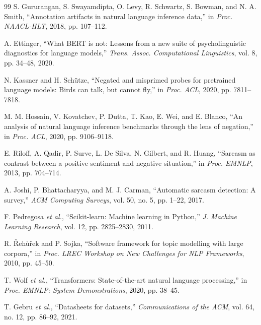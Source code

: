 \documentclass[conference]{IEEEtran}
\begin{document}
\begin{thebibliography}{99}
 S. Gururangan, S. Swayamdipta, O. Levy, R. Schwartz, S. Bowman, and N. A. Smith, ``Annotation artifacts in natural language inference data,'' in \emph{Proc. NAACL-HLT}, 2018, pp. 107--112.

 A. Ettinger, ``What BERT is not: Lessons from a new suite of psycholinguistic diagnostics for language models,'' \emph{Trans. Assoc. Computational Linguistics}, vol. 8, pp. 34--48, 2020.

 N. Kassner and H. Sch\"utze, ``Negated and misprimed probes for pretrained language models: Birds can talk, but cannot fly,'' in \emph{Proc. ACL}, 2020, pp. 7811--7818.

 M. M. Hossain, V. Kovatchev, P. Dutta, T. Kao, E. Wei, and E. Blanco, ``An analysis of natural language inference benchmarks through the lens of negation,'' in \emph{Proc. ACL}, 2020, pp. 9106--9118.

 E. Riloff, A. Qadir, P. Surve, L. De Silva, N. Gilbert, and R. Huang, ``Sarcasm as contrast between a positive sentiment and negative situation,'' in \emph{Proc. EMNLP}, 2013, pp. 704--714.

 A. Joshi, P. Bhattacharyya, and M. J. Carman, ``Automatic sarcasm detection: A survey,'' \emph{ACM Computing Surveys}, vol. 50, no. 5, pp. 1--22, 2017.

 F. Pedregosa \emph{et al.}, ``Scikit-learn: Machine learning in Python,'' \emph{J. Machine Learning Research}, vol. 12, pp. 2825--2830, 2011.

 R. \v{R}eh\r{u}\v{r}ek and P. Sojka, ``Software framework for topic modelling with large corpora,'' in \emph{Proc. LREC Workshop on New Challenges for NLP Frameworks}, 2010, pp. 45--50.

 T. Wolf \emph{et al.}, ``Transformers: State-of-the-art natural language processing,'' in \emph{Proc. EMNLP: System Demonstrations}, 2020, pp. 38--45.

 T. Gebru \emph{et al.}, ``Datasheets for datasets,'' \emph{Communications of the ACM}, vol. 64, no. 12, pp. 86--92, 2021.

\end{thebibliography}
\end{document}
